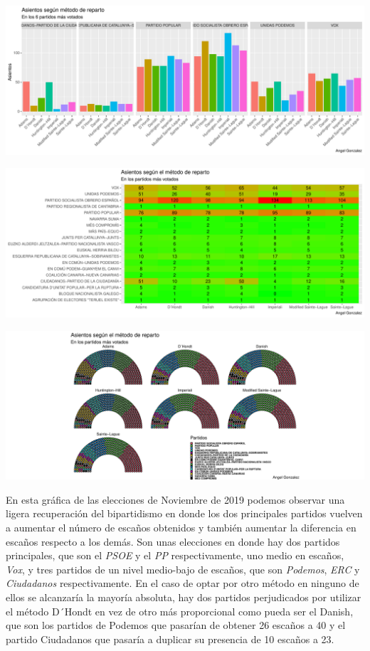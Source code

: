 \documentclass[12pt,a4paper,]{book}
\numberwithin{dummy}{section}
\theoremstyle{ocrenumbox}
\theoremstyle{blacknumex}
\theoremstyle{blacknumbox}
\theoremstyle{ocrenum}
\theoremstyle{ocrenum}
\begin{document}
\begin{center}\includegraphics[width=0.95\linewidth]{figurasR/unnamed-chunk-185-1} \end{center}

\begin{center}\includegraphics[width=0.95\linewidth]{figurasR/unnamed-chunk-185-2} \end{center}

\begin{center}\includegraphics[width=0.95\linewidth]{figurasR/unnamed-chunk-185-3} \end{center}

En esta gráfica de las elecciones de Noviembre de 2019 podemos observar
una ligera recuperación del bipartidismo en donde los dos principales
partidos vuelven a aumentar el número de escaños obtenidos y también
aumentar la diferencia en escaños respecto a los demás. Son unas
elecciones en donde hay dos partidos principales, que son el \emph{PSOE}
y el \emph{PP} respectivamente, uno medio en escaños, \emph{Vox}, y tres
partidos de un nivel medio-bajo de escaños, que son \emph{Podemos},
\emph{ERC} y \emph{Ciudadanos} respectivamente. En el caso de optar por
otro método en ninguno de ellos se alcanzaría la mayoría absoluta, hay
dos partidos perjudicados por utilizar el método D´Hondt en vez de otro
más proporcional como pueda ser el Danish, que son los partidos de
Podemos que pasarían de obtener 26 escaños a 40 y el partido Ciudadanos
que pasaría a duplicar su presencia de 10 escaños a 23.
\end{document}
